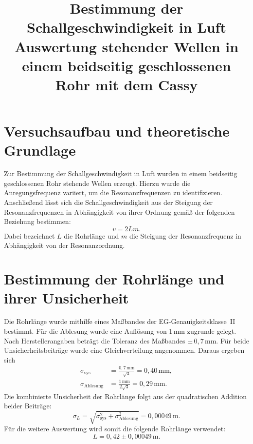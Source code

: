 \documentclass[11pt,a4paper]{article}
\title{Bestimmung der Schallgeschwindigkeit in Luft\\
       \large Auswertung stehender Wellen in einem beidseitig geschlossenen Rohr mit dem Cassy}
\author{}
\date{}
\begin{document}
\maketitle

\section{Versuchsaufbau und theoretische Grundlage}

Zur Bestimmung der Schallgeschwindigkeit in Luft wurden in einem beidseitig geschlossenen Rohr stehende Wellen erzeugt. Hierzu wurde die Anregungsfrequenz variiert, um die Resonanzfrequenzen zu identifizieren. Anschließend lässt sich die Schallgeschwindigkeit aus der Steigung der Resonanzfrequenzen in Abhängigkeit von ihrer Ordnung gemäß der folgenden Beziehung bestimmen:
\begin{equation}
  v = 2 L m.
  \label{eq:schallgeschwindigkeit}
\end{equation}
Dabei bezeichnet $L$ die Rohrlänge und $m$ die Steigung der Resonanzfrequenz in Abhängigkeit von der Resonanzordnung.

\section{Bestimmung der Rohrlänge und ihrer Unsicherheit}

Die Rohrlänge wurde mithilfe eines Maßbandes der EG-Genauigkeitsklasse~II bestimmt. Für die Ablesung wurde eine Auflösung von $\mathrm{1\,mm}$ zugrunde gelegt. Nach Herstellerangaben beträgt die Toleranz des Maßbandes $\pm\,\mathrm{0{,}7\,mm}$. Für beide Unsicherheitsbeiträge wurde eine Gleichverteilung angenommen. Daraus ergeben sich
\begin{align}
  \sigma_{\mathrm{sys}}
    &= \frac{\mathrm{0{,}7\,mm}}{\sqrt{3}}
     = \mathrm{0{,}40\,mm}, \\
  \sigma_{\mathrm{Ablesung}}
    &= \frac{\mathrm{1\,mm}}{2\sqrt{3}}
     = \mathrm{0{,}29\,mm}.
\end{align}
Die kombinierte Unsicherheit der Rohrlänge folgt aus der quadratischen Addition beider Beiträge:
\begin{equation}
  \sigma_L
    = \sqrt{\sigma_{\mathrm{sys}}^2+\sigma_{\mathrm{Ablesung}}^2}
    = \mathrm{0{,}00049\,m}.
\end{equation}
Für die weitere Auswertung wird somit die folgende Rohrlänge verwendet:
\begin{equation}
  L = 0{,}42 \pm 0{,}00049\,\mathrm{m}.
  \label{eq:rohrlaenge}
\end{equation}
\end{document}
